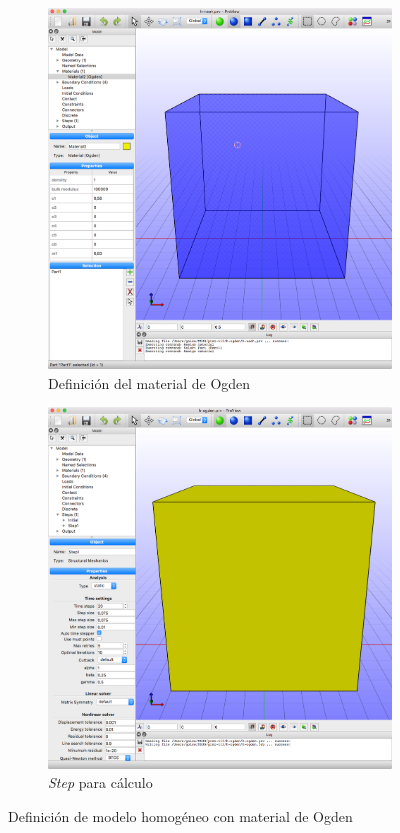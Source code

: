 \begin{figure}[!htp]
\centering
\begin{subfigure}[b]{0.48\textwidth}
\centering
\includegraphics[width=\textwidth]{figuras_3/01-mat-ogden.png}
\caption{Definición del material de Ogden}
\label{fig:01-mat-ogden}
\end{subfigure}
\begin{subfigure}[b]{0.48\textwidth}
\centering
\includegraphics[width=\textwidth]{figuras_3/02-step-ogden.png}
\caption{\emph{Step} para cálculo}
\label{fig:02-step-ogden}
\end{subfigure}
\caption{Definición de modelo homogéneo con material de Ogden}
\label{fig:pre-hogden}
\end{figure}

